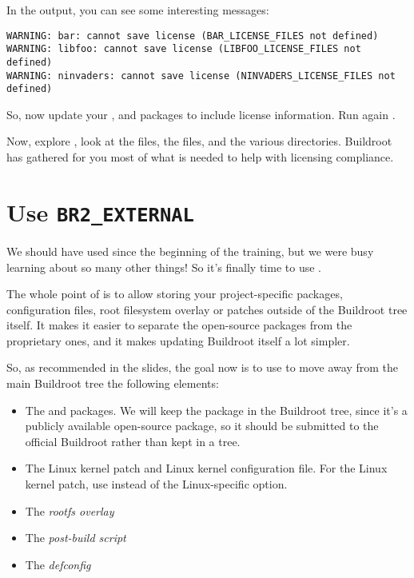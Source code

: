 In the output, you can see some interesting messages:

\begin{verbatim}
WARNING: bar: cannot save license (BAR_LICENSE_FILES not defined)
WARNING: libfoo: cannot save license (LIBFOO_LICENSE_FILES not defined)
WARNING: ninvaders: cannot save license (NINVADERS_LICENSE_FILES not defined)
\end{verbatim}

So, now update your ,  and 
packages to include license information. Run again .

Now, explore , look at the  files,
the  files, and the various directories. Buildroot has
gathered for you most of what is needed to help with licensing
compliance.

\section{Use {\tt BR2\_EXTERNAL}}

We should have used  since the beginning of the
training, but we were busy learning about so many other things! So
it's finally time to use .

The whole point of  is to allow storing your
project-specific packages, configuration files, root filesystem
overlay or patches outside of the Buildroot tree itself. It makes it
easier to separate the open-source packages from the proprietary ones,
and it makes updating Buildroot itself a lot simpler.

So, as recommended in the slides, the goal now is to use
 to move away from the main Buildroot tree the
following elements:

\begin{itemize}

\item The  and  packages. We will keep the
   package in the Buildroot tree, since it's a
  publicly available open-source package, so it should be submitted to
  the official Buildroot rather than kept in a 
  tree.

\item The Linux kernel patch and Linux kernel configuration file. For
  the Linux kernel patch, use  instead of
  the Linux-specific  option.

\item The {\em rootfs overlay}

\item The {\em post-build script}

\item The {\em defconfig}

\end{itemize}

